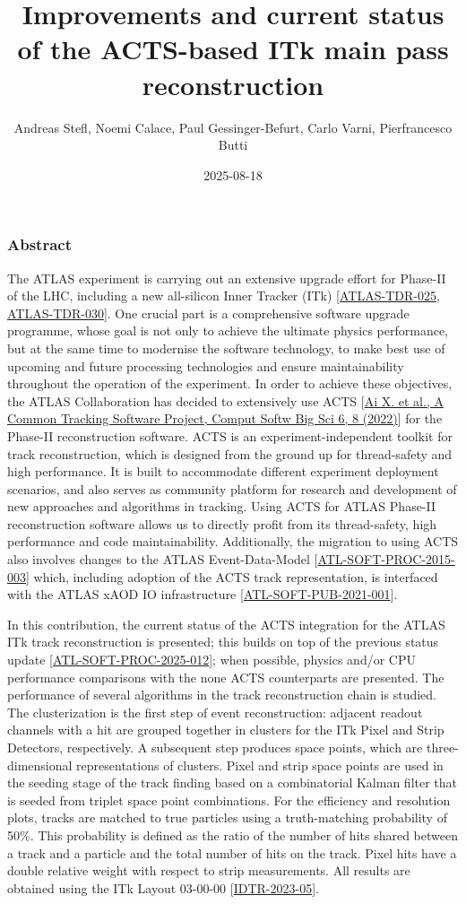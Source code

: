 \documentclass[aspectratio=169]{beamer}
\title{Improvements and current status of the ACTS-based ITk main pass reconstruction}
\author{Andreas Stefl, Noemi Calace, Paul Gessinger-Befurt, Carlo Varni, Pierfrancesco Butti}
\institute{CERN}
\date{2025-08-18}
\begin{document}
\frame{\titlepage}

\begin{frame}
\frametitle{Abstract}
\tiny
The ATLAS experiment is carrying out an extensive upgrade effort for Phase-II of the LHC, including a new all-silicon Inner Tracker (ITk) [\href{https://cds.cern.ch/record/2257755}{ATLAS-TDR-025}, \href{https://cds.cern.ch/record/2285585}{ATLAS-TDR-030}]. One crucial part is a comprehensive software upgrade programme, whose goal is not only to achieve the ultimate physics performance, but at the same time to modernise the software technology, to make best use of upcoming and future processing technologies and ensure maintainability throughout the operation of the experiment. In order to achieve these objectives, the ATLAS Collaboration has decided to extensively use ACTS [\href{https://doi.org/10.1007/s41781-021-00078-8}{Ai X. et al., A Common Tracking Software Project, Comput Softw Big Sci 6, 8 (2022)}] for the Phase-II reconstruction software. ACTS is an experiment-independent toolkit for track reconstruction, which is designed from the ground up for thread-safety and high performance. It is built to accommodate different experiment deployment scenarios, and also serves as community platform for research and development of new approaches and algorithms in tracking. Using ACTS for ATLAS Phase-II reconstruction software allows us to directly profit from its thread-safety, high performance and code maintainability. Additionally, the migration to using ACTS also involves changes to the ATLAS Event-Data-Model [\href{https://cds.cern.ch/record/2014150}{ATL-SOFT-PROC-2015-003}] which, including adoption of the ACTS track representation, is interfaced with the ATLAS xAOD IO infrastructure [\href{https://cds.cern.ch/record/2767187}{ATL-SOFT-PUB-2021-001}].

In this contribution, the current status of the ACTS integration for the ATLAS ITk track reconstruction is presented; this builds on top of the previous status update [\href{https://cds.cern.ch/record/2921878}{ATL-SOFT-PROC-2025-012}]; when possible, physics and/or CPU performance comparisons with the none ACTS counterparts are presented. The performance of several algorithms in the track reconstruction chain is studied. The clusterization is the first step of event reconstruction: adjacent readout channels with a hit are grouped together in clusters for the ITk Pixel and Strip Detectors, respectively. A subsequent step produces space points, which are three-dimensional representations of clusters. Pixel and strip space points are used in the seeding stage of the track finding based on a combinatorial Kalman filter that is seeded from triplet space point combinations. For the efficiency and resolution plots, tracks are matched to true particles using a truth-matching probability of 50\%. This probability is defined as the ratio of the number of hits shared between a track and a particle and the total number of hits on the track. Pixel hits have a double relative weight with respect to strip measurements. All results are obtained using the ITk Layout 03-00-00 [\href{https://atlas.web.cern.ch/Atlas/GROUPS/PHYSICS/PLOTS/IDTR-2023-05}{IDTR-2023-05}].


\end{frame}
\end{document}
